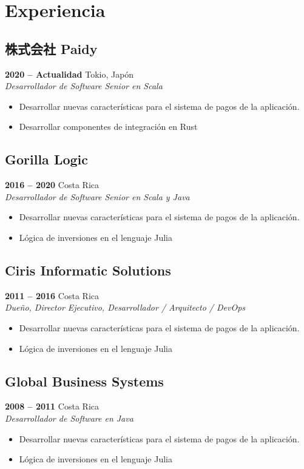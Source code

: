 \documentclass[a4paper,10pt]{article}
\begin{document}
\section*{Experiencia}
\subsection*{株式会社 Paidy}
\textbf{2020 -- Actualidad} \hfill  Tokio, Japón \\
\emph{Desarrollador de Software Senior en Scala}
\begin{itemize}
    \item Desarrollar nuevas características para el sistema de pagos de la aplicación.
    \item Desarrollar componentes de integración en Rust
\end{itemize}

\subsection*{Gorilla Logic}
\textbf{2016 -- 2020} \hfill  Costa Rica \\
\emph{Desarrollador de Software Senior en Scala y Java}
\begin{itemize}
    \item Desarrollar nuevas características para el sistema de pagos de la aplicación.
    \item Lógica de inversiones en el lenguaje Julia
\end{itemize}

\subsection*{Ciris Informatic Solutions}
\textbf{2011 -- 2016} \hfill  Costa Rica \\
\emph{Dueño, Director Ejecutivo, Desarrollador / Arquitecto / DevOps  }
\begin{itemize}
    \item Desarrollar nuevas características para el sistema de pagos de la aplicación.
    \item Lógica de inversiones en el lenguaje Julia
\end{itemize}

\subsection*{Global Business Systems}
\textbf{2008 -- 2011} \hfill  Costa Rica \\
\emph{Desarrollador de Software en Java  }
\begin{itemize}
    \item Desarrollar nuevas características para el sistema de pagos de la aplicación.
    \item Lógica de inversiones en el lenguaje Julia
\end{itemize}
\end{document}
